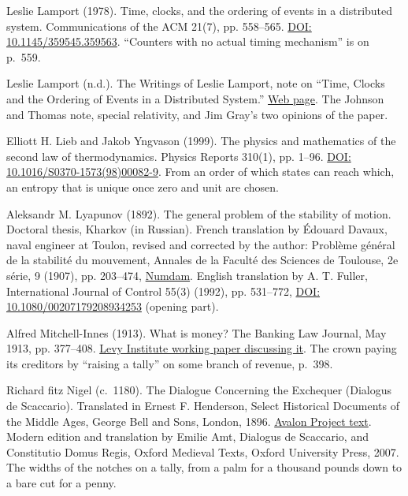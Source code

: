 \noindent Leslie Lamport (1978). Time, clocks, and the ordering of events in a distributed system. Communications of the ACM 21(7), pp. 558--565. \href{https://doi.org/10.1145/359545.359563}{DOI: 10.1145/359545.359563}. ``Counters with no actual timing mechanism'' is on p.~559.
\par\medskip

\noindent Leslie Lamport (n.d.). The Writings of Leslie Lamport, note on ``Time, Clocks and the Ordering of Events in a Distributed System.'' \href{https://lamport.azurewebsites.net/pubs/pubs.html}{Web page}. The Johnson and Thomas note, special relativity, and Jim Gray's two opinions of the paper.
\par\medskip

\noindent Elliott H. Lieb and Jakob Yngvason (1999). The physics and mathematics of the second law of thermodynamics. Physics Reports 310(1), pp. 1--96. \href{https://doi.org/10.1016/S0370-1573(98)00082-9}{DOI: 10.1016/S0370-1573(98)00082-9}. From an order of which states can reach which, an entropy that is unique once zero and unit are chosen.
\par\medskip

\noindent Aleksandr M. Lyapunov (1892). The general problem of the stability of motion. Doctoral thesis, Kharkov (in Russian). French translation by \'Edouard Davaux, naval engineer at Toulon, revised and corrected by the author: Probl\`eme g\'en\'eral de la stabilit\'e du mouvement, Annales de la Facult\'e des Sciences de Toulouse, 2e s\'erie, 9 (1907), pp. 203--474, \href{http://www.numdam.org/item/AFST_1907_2_9__203_0/}{Numdam}. English translation by A. T. Fuller, International Journal of Control 55(3) (1992), pp. 531--772, \href{https://doi.org/10.1080/00207179208934253}{DOI: 10.1080/00207179208934253} (opening part).
\par\medskip

\noindent Alfred Mitchell-Innes (1913). What is money? The Banking Law Journal, May 1913, pp. 377--408. \href{https://www.levyinstitute.org/pubs/wp_717.pdf}{Levy Institute working paper discussing it}. The crown paying its creditors by ``raising a tally'' on some branch of revenue, p.~398.
\par\medskip

\noindent Richard fitz Nigel (c.\ 1180). The Dialogue Concerning the Exchequer (Dialogus de Scaccario). Translated in Ernest F. Henderson, Select Historical Documents of the Middle Ages, George Bell and Sons, London, 1896. \href{https://avalon.law.yale.edu/medieval/excheq.asp}{Avalon Project text}. Modern edition and translation by Emilie Amt, Dialogus de Scaccario, and Constitutio Domus Regis, Oxford Medieval Texts, Oxford University Press, 2007. The widths of the notches on a tally, from a palm for a thousand pounds down to a bare cut for a penny.
\par\medskip

